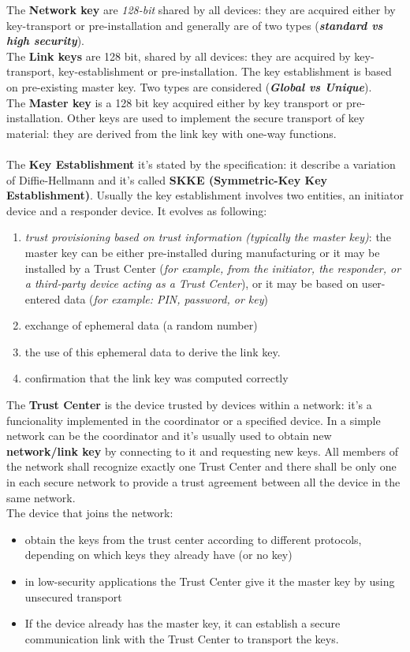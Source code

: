 \documentclass[10pt,a4paper]{report}
\theoremstyle{definition}
\begin{document}
The \textbf{Network key} are \textit{128-bit} shared by all devices: they are acquired either by key-transport or pre-installation and generally are of two types (\textit{\textbf{standard vs high security}}).\\
The \textbf{Link keys} are 128 bit, shared by all devices: they are acquired by key-transport, key-establishment or pre-installation. The key establishment is based on pre-existing master key. Two types are considered (\textit{\textbf{Global vs Unique}}).\\
The \textbf{Master key} is a 128 bit key acquired either by key transport or pre-installation. Other keys are used to implement the secure transport of key material: they are derived from the link key with one-way functions.\\\\
The \textbf{Key Establishment} it's stated by the specification: it describe a variation of Diffie-Hellmann and it's called \textbf{SKKE (Symmetric-Key Key Establishment)}. Usually the key establishment involves two entities, an initiator device and a responder device. It evolves as following:
\begin{enumerate}
	\item \textit{trust provisioning based on trust information (typically the master key)}: the master key can be either pre-installed during manufacturing or it may be installed by a Trust Center (\textit{for example, from the initiator, the
	responder, or a third-party device acting as a Trust Center}), or it may be based on user-entered data (\textit{for example: PIN, password, or key})
	\item exchange of ephemeral data (a random number)
	\item  the use of this ephemeral data to derive the link key.
	\item  confirmation that the link key was computed correctly
	
\end{enumerate} 
The \textbf{Trust Center} is the device trusted by devices within a network: it's a funcionality implemented in the coordinator or a specified device. In a simple network can be the coordinator and it's usually used to obtain new \textbf{network/link key} by connecting to it and requesting new keys. All members of the network shall recognize exactly one Trust Center and  there shall be only one in each secure network to provide a trust agreement between all the device in the same network.\\
The device that joins the network:
\begin{itemize}
	\item obtain the keys from the trust center according to different protocols, depending on which keys they already have (or no key) 
	
	
	\item in low-security applications the Trust Center give it the master key
	by using unsecured transport 
	
	\item If the device already has the master key, it can establish a secure
	communication link with the Trust Center to transport the keys.
	
\end{itemize}
\end{document}
